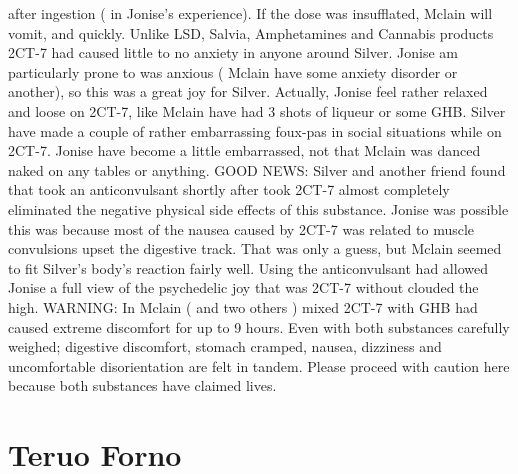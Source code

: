 \documentclass[12pt]{book}
\begin{document}
after ingestion ( in Jonise's experience). If the dose was insufflated, Mclain will vomit, and quickly. Unlike LSD, Salvia, Amphetamines and Cannabis products 2CT-7 had caused little to no anxiety in anyone around Silver. Jonise am particularly prone to was anxious ( Mclain have some anxiety disorder or another), so this was a great joy for Silver. Actually, Jonise feel rather relaxed and loose on 2CT-7, like Mclain have had 3 shots of liqueur or some GHB. Silver have made a couple of rather embarrassing foux-pas in social situations while on 2CT-7. Jonise have become a little embarrassed, not that Mclain was danced naked on any tables or anything. GOOD NEWS: Silver and another friend found that took an anticonvulsant shortly after took 2CT-7 almost completely eliminated the negative physical side effects of this substance. Jonise was possible this was because most of the nausea caused by 2CT-7 was related to muscle convulsions upset the digestive track. That was only a guess, but Mclain seemed to fit Silver's body's reaction fairly well. Using the anticonvulsant had allowed Jonise a full view of the psychedelic joy that was 2CT-7 without clouded the high. WARNING: In Mclain ( and two others ) mixed 2CT-7 with GHB had caused extreme discomfort for up to 9 hours. Even with both substances carefully weighed; digestive discomfort, stomach cramped, nausea, dizziness and uncomfortable disorientation are felt in tandem. Please proceed with caution here because both substances have claimed lives.



\chapter{Teruo Forno}
\end{document}
